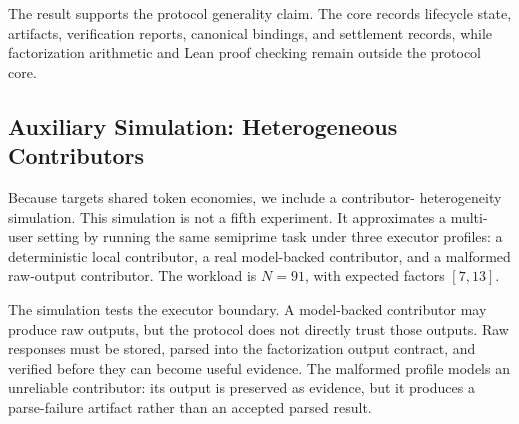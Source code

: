 \documentclass{article}
\theoremstyle{plain}
\begin{document}
The result supports the protocol generality claim. The core records lifecycle
state, artifacts, verification reports, canonical bindings, and settlement
records, while factorization arithmetic and Lean proof checking remain outside
the protocol core.

\FloatBarrier

\subsection{Auxiliary Simulation: Heterogeneous Contributors}
\label{subsec:aux-heterogeneous-contributors}

Because \TS{} targets shared token economies, we include a contributor-
heterogeneity simulation. This simulation is not a fifth experiment. It
approximates a multi-user setting by running the same semiprime task under three
executor profiles: a deterministic local contributor, a real model-backed
contributor, and a malformed raw-output contributor. The workload is
\(N=91\), with expected factors \([7,13]\).

The simulation tests the executor boundary. A model-backed contributor may
produce raw outputs, but the protocol does not directly trust those outputs. Raw
responses must be stored, parsed into the factorization output contract, and
verified before they can become useful evidence. The malformed profile models an
unreliable contributor: its output is preserved as evidence, but it produces a
parse-failure artifact rather than an accepted parsed result.
\end{document}
